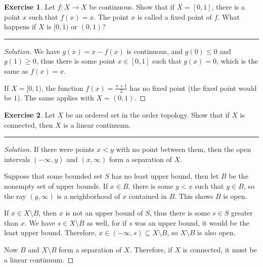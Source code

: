 \documentclass{article}
\theoremstyle{definition}
\newtheorem{exercise}{Exercise}[section]
\begin{document}
\pagebreak

\begin{exercise}
  Let $f:X\to X$ be continuous. Show that if $X = [0,1]$, there is a point $x$ such that $f(x) = x$. The point $x$ is called a fixed point of $f$. What happens if $X$ is $[0,1)$ or $(0,1)$?
\end{exercise}
\hrule
\begin{proof}[Solution]
  We have $g(x) = x - f(x)$ is continuous, and $g(0) \le 0$ and $g(1) \ge 0$, thus there is some point $x\in[0,1]$ such that $g(x) = 0$, which is the same as $f(x) = x$.

  If $X = [0,1)$, the function $f(x) = \frac{x+1}{2}$ has no fixed point (the fixed point would be $1$). The same applies with $X = (0,1)$.
\end{proof}

\pagebreak

\begin{exercise}
  Let $X$ be an ordered set in the order topology. Show that if $X$ is connected, then $X$ is a linear continuum.
\end{exercise}
\hrule
\begin{proof}[Solution]
  If there were points $x < y$ with no point between them, then the open intervals $(-\infty, y)$ and $(x,\infty)$ form a separation of $X$.

  Suppose that some bounded set $S$ has no least upper bound, then let $B$ be the nonempty set of upper bounds.
  If $x\in B$, there is some $y < x$ such that $y\in B$, so the ray $(y,\infty)$ is a neighborhood of $x$ contained in $B$. This shows $B$ is open.

  If $x\in X\setminus B$, then $x$ is not an upper bound of $S$, thus there is some $s\in S$ greater than $x$. We have $s\in X\setminus B$ as well, for if $s$ was an upper bound, it would be the least upper bound. Therefore, $x\in (-\infty, s)\subseteq X\setminus B$, so $X\setminus B$ is also open.

  Now $B$ and $X\setminus B$ form a separation of $X$. Therefore, if $X$ is connected, it must be a linear continuum.
\end{proof}

\pagebreak
\end{document}
